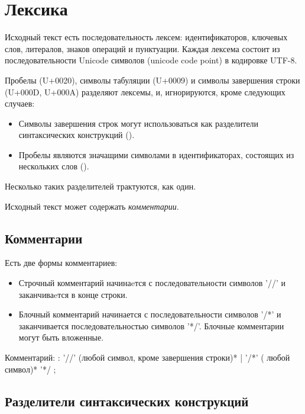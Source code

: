 \hypertarget{lexica}{%
\section{Лексика}\label{lex:chapter}}

Исходный текст есть последовательность лексем: идентификаторов, ключевых слов, литералов, знаков операций и пунктуации. 
Каждая лексема состоит из последовательности Unicode символов (unicode code point) в кодировке UTF-8.

Пробелы (U+0020), символы табуляции (U+0009) и символы завершения строки (U+000D, U+000A) разделяют лексемы, и, игнорируются, кроме следующих случаев:
\begin{itemize}
\item
Символы завершения строк могут использоваться как разделители синтаксических конструкций ().
\item
  Пробелы являются значащими символами в идентификаторах, состоящих из нескольких слов (). 
\end{itemize}

Несколько таких разделителей трактуются, как один.

Исходный текст может содержать \emph{комментарии}.

\hypertarget{comments}{%
\subsection{Комментарии}\label{lex:comments}}

Есть две формы комментариев:
\begin{itemize}
\item
Строчный комментарий начинаeтся с последовательности символов '//' и заканчиваeтся в конце строки.
\item
Блочный комментарий начинается с последовательности символов '/*' и заканчивается последовательностью символов '*/'. 
Блочные комментарии могут быть вложенные.
\end{itemize}

\begin{Grammar}
Комментарий: 
	: '//' (любой символ, кроме завершения строки)*
    | '/*'  ( любой символ)* '*/
	;
\end{Grammar}

\hypertarget{separators}{%
\subsection{Разделители синтаксических конструкций}\label{lex:separators}}

